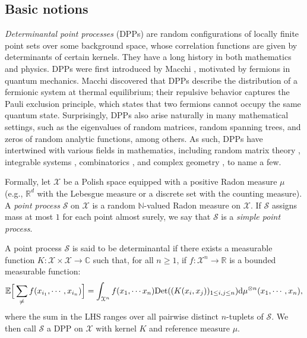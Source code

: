 \subsection{Basic notions}

\emph{Determinantal point processes} (DPPs) are random configurations of locally finite point sets over some background space, whose correlation functions are given by determinants of certain kernels. They have a long history in both mathematics and physics. DPPs were first introduced by Macchi \cite{Mac72}, motivated by fermions in quantum mechanics. Macchi discovered that DPPs describe the distribution of a fermionic system at thermal equilibrium; their repulsive behavior captures the Pauli exclusion principle, which states that two fermions cannot occupy the same quantum state. Surprisingly, DPPs also arise naturally in many mathematical settings, such as the eigenvalues of random matrices, random spanning trees, and zeros of random analytic functions, among others. As such, DPPs have intertwined with various fields in mathematics, including random matrix theory \cite{borodin,johanssondpp}, integrable systems \cite{Deift_1,Deift_2}, combinatorics \cite{borodin2015_integrable,borodin2016_integrable}, and complex geometry \cite{Berman0,Berman1,Berman2,Berman3}, to name a few.

Formally, let $\mathcal X$ be a Polish space equipped with a positive Radon measure $\mu$ (e.g., $\mathbb R^d$ with the Lebesgue measure or a discrete set with the counting measure).
A \emph{point process} $\mathcal S$ on $\mathcal{X}$ is a random $\mathbb N$-valued Radon measure on $\mathcal X$. If $\mathcal S$ assigns mass at most $1$ for each point almost surely, we say that $\mathcal S$ is a \emph{simple point process}.

\begin{definition}[DPPs] \label{def:GeneralDPPs}
    A point process $\mathcal S$ is said to be determinantal if there exists a measurable function $K : \mathcal{X} \times \mathcal{X} \rightarrow \mathbb{C}$ such that, for all $n \geq 1$, if $f : \mathcal{X}^n \rightarrow \mathbb{R}$ is a bounded measurable function:
    \[ \mathbb{E}\Big [\sum_{\neq} f(x_{i_1}, \cdots, x_{i_n}) \Big ] = \int _{\mathcal{X}^n}f(x_1, \cdots x_n) \mathrm{Det}((K(x_i,x_j))_{1 \leq i,j \leq n}) \mathrm{d}\mu^{\otimes n}(x_1, \cdots, x_n), \]
    where the sum in the LHS ranges over all pairwise distinct $n$-tuplets of $\mathcal{S}$.
    We then call $\mathcal S$ a DPP on $\mathcal X$ with kernel $K$ and reference measure $\mu$.
\end{definition}

